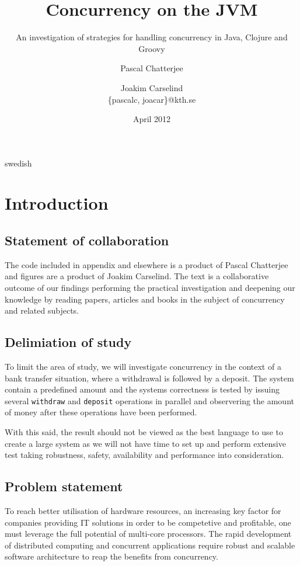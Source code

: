 \documentclass[a4paper,12pt]{kth-mag}
\title{Concurrency on the JVM}
\subtitle{An investigation of strategies for handling concurrency in Java, Clojure and Groovy}
\author{Pascal Chatterjee \and Joakim Carselind \\ \small{\{pascalc, joacar\}@kth.se}}
\date{April 2012}
\begin{document}
\frontmatter
\pagestyle{empty}
\removepagenumbers
\maketitle
{}

\begin{abstract}
    
\end{abstract}

\clearpage

\begin{foreignabstract}{swedish}
  
\end{foreignabstract}

\clearpage

\tableofcontents*
\mainmatter
\pagestyle{newchap}
\makeatletter\@openrightfalse

\chapter{Introduction}

\section{Statement of collaboration}
The code included in appendix and elsewhere is a product of Pascal Chatterjee and figures are a product of Joakim Carselind. The text is a collaborative outcome of our findings performing the practical investigation and deepening our knowledge by reading papers, articles and books in the subject of concurrency and related subjects.

\section{Delimiation of study}
To limit the area of study, we will investigate concurrency in the context of a bank transfer situation, where a withdrawal is followed by a deposit. The system contain a predefined amount and the systems correctness is tested by issuing several \texttt{withdraw} and \texttt{deposit} operations in parallel and observering the amount of money after these operations have been performed.

With this said, the result should not be viewed as the best language to use to create a large system as we will not have time to set up and perform extensive test taking robustness, safety, availability and performance into consideration.

\section{Problem statement}
To reach better utilisation of hardware resources, an increasing key factor for companies providing IT solutions in order to be competetive and profitable, one must leverage the full potential of multi-core processors. The rapid development of distributed computing and concurrent applications require robust and scalable software architecture to reap the benefits from concurrency.
\end{document}
